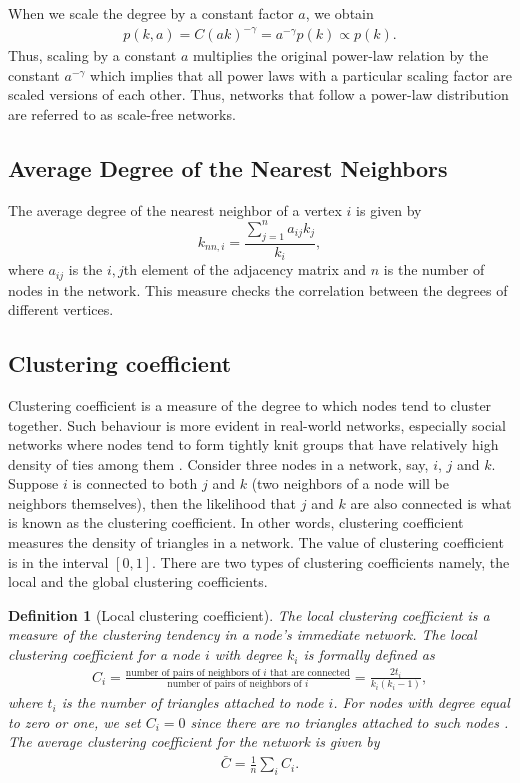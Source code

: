 \documentclass[10pt,a4paper]{article}
\newtheorem{defn}{Definition}
\begin{document}
When we scale the degree by a constant factor $a$, we obtain
\begin{eqnarray}
p(k,a) = C(ak)^{-\gamma} = a^{-\gamma} p(k) \propto p(k).
\label{scale}
\end{eqnarray}
Thus, scaling by a constant $a$ multiplies the original power-law relation by the constant $a^{-\gamma}$ which implies that all power laws with a particular scaling factor are scaled versions of each other. Thus, networks that follow a power-law distribution are referred to as scale-free networks. 

\subsection{Average Degree of the Nearest Neighbors}
The average degree of the nearest neighbor of a vertex $i$ is given by
\begin{equation}
k_{nn,i} = \frac{\sum_{j=1}^{n} a_{ij} k_j}{k_i},
\end{equation}
where $a_{ij}$ is the $i,j$th element of the adjacency matrix and $n$ is the number of nodes in the network.
This measure checks the correlation between the degrees of different vertices.

\subsection{Clustering coefficient}
Clustering coefficient is a measure of the degree to which nodes tend to cluster together. Such behaviour is more evident in real-world networks, especially social networks where nodes tend to form tightly knit groups that have relatively high density of ties among them \citep{estrada2015first}.
Consider three nodes in a network, say, $i$, $j$ and $k$. Suppose $i$ is connected to both $j$ and $k$ (two neighbors of a node will be neighbors themselves), then the likelihood that $j$ and $k$ are also connected is what is known as the clustering coefficient. In other words, clustering coefficient measures the density of triangles in a  network. 
The value of clustering coefficient is in the interval $[0,1]$. There are two types of clustering coefficients namely, the local and the global clustering coefficients.

\begin{defn}[Local clustering coefficient]
	The local clustering coefficient is a measure of the clustering tendency in a node's immediate network. The local clustering coefficient for a node $i$ with degree $k_i$ is formally defined as 
	\begin{eqnarray}
	C_i = \frac{\text{number of pairs of neighbors of } i\text{ that are connected}}{\text{number of pairs of neighbors of }i}= \frac{2 t_i}{k_i(k_i-1)},  
	\end{eqnarray}
	where $t_i$ is the number of triangles attached to node $i$. For nodes with degree equal to zero or one, we set $C_i = 0$ since there are no triangles attached to such nodes \citep{newman2010networks}. The average clustering coefficient for the network is given by
	\begin{eqnarray}
	\bar{C} = \frac{1}{n} \sum_i C_i.
	\end{eqnarray} 
\end{defn}
\end{document}
